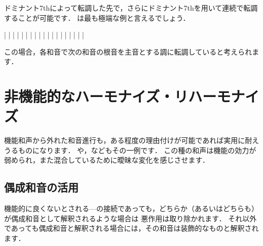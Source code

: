 \documentclass[dvipdfmx,uplatex,b5paper,openany,jbase=12Q,nomag*,textwidth-limit=44%
               ]{gachimuchi}
\begin{document}
ドミナント7thによって転調した先で，さらにドミナント7thを用いて連続で転調することが可能です．
は最も極端な例と言えるでしょう．

\begin{floatMusic}[pos=ht]
  \generalmeter{\meterC}%
  \Startpiece
  \NOTes%
  |%
  \en%
  \NOTes%
  |%
  \en\bar%
  \NOTes%
  |%
  \en%
  \NOTes%
  |%
  \en\bar%
  \NOTes%
  |%
  \en%
  \NOTes%
  |%
  \en\bar%
  \NOTes%
  |%
  \en%
  \NOTes%
  |%
  \en\bar\addspace{.2\afterruleskip}%
  \NOTes%
  |%
  \en%
  \NOTes%
  |%
  \en\bar%
  \NOTes%
  |%
  \en%
  \NOTes%
  |%
  \en\bar%
  \notes\sk\en%
  \NOTEs%
  |%
  \en\setdoublebar%
  \endpiece
\end{floatMusic}

この場合，各和音で次の和音の根音を主音とする調に転調していると考えられます．


\chapter{非機能的なハーモナイズ・リハーモナイズ}
機能和声から外れた和音進行も，ある程度の理由付けが可能であれば実用に耐えうるものになります．
や，などもその一例です．
この種の和声は機能の効力が弱められ，また混合しているために曖昧な変化を感じさせます．

\section{偶成和音の活用}
機能的に良くないとされる---の接続であっても，どちらか（あるいはどちらも）が偶成和音として解釈されるような場合は
悪作用は取り除かれます．
それ以外であっても偶成和音と解釈される場合には，その和音は装飾的なものと解釈されます．
\end{document}
